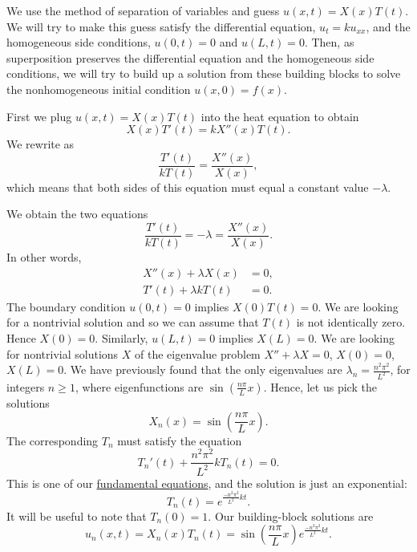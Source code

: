 \documentclass{ximera}
\begin{document}
\begin{exampleSol}
    We use the method of separation of variables and guess $u(x,t) = X(x)T(t)$. We will try to make this guess satisfy the differential equation, $u_t = k u_{xx}$, and the homogeneous side conditions, $u(0,t) = 0$ and $u(L,t) = 0$.  Then, as superposition preserves the differential equation and the homogeneous side conditions, we will try to build up a solution from these building blocks to solve the nonhomogeneous initial condition $u(x,0) = f(x)$.
    
    First we plug $u(x,t) = X(x)T(t)$ into the heat equation to obtain
    \begin{equation*}
        X(x)T'(t) = k X''(x)T(t) .
    \end{equation*}
    We rewrite as
    \begin{equation*}
        \frac{T'(t)}{k T(t)} = \frac{X''(x)}{X(x)},
    \end{equation*}
    which means that both sides of this equation must equal a constant value $-\lambda$. 
    
    We obtain the two equations
    \begin{equation*}
        \frac{T'(t)}{k T(t)} = -\lambda = \frac{X''(x)}{X(x)} .
    \end{equation*}
    In other words,
    \begin{align*}
        X''(x) + \lambda X(x) &= 0 , \\
        T'(t) + \lambda k T(t) &= 0 .
    \end{align*}
    The boundary condition $u(0,t) = 0$ implies $X(0)T(t) = 0$.  We are looking for a nontrivial solution and so we can assume that $T(t)$ is not identically zero.  Hence $X(0) = 0$.  Similarly, $u(L,t) = 0$ implies $X(L) = 0$.  We are looking for nontrivial solutions $X$ of the eigenvalue problem $X'' + \lambda X = 0$, $X(0) = 0$, $X(L) = 0$.  We have previously found that the only eigenvalues are $\lambda_n = \frac{n^2 \pi^2}{L^2}$, for integers $n \geq 1$, where eigenfunctions are $\sin \left(\frac{n \pi}{L} x\right)$.  Hence, let us pick the solutions
    \begin{equation*}
        X_n (x) = \sin \left(\frac{n \pi}{L} x \right) .
    \end{equation*}
    The corresponding $T_n$ must satisfy the equation
    \begin{equation*}
        T_n'(t) + \frac{n^2 \pi^2}{L^2} k T_n(t) = 0 .
    \end{equation*}
    This is one of our \hyperref[subsection:fourfundamental]{fundamental equations}, and the solution is just an exponential:
    \begin{equation*}
        T_n(t) = e^{\frac{-n^2 \pi^2}{L^2} k t} .
    \end{equation*}
    It will be useful to note that $T_n(0) = 1$. Our building-block solutions are
    \begin{equation*}
        u_n(x,t) = X_n(x)T_n(t) = \sin \left( \frac{n \pi}{L} x \right) e^{\frac{-n^2 \pi^2}{L^2} k t} .
    \end{equation*}
    

\end{exampleSol}
\end{document}

